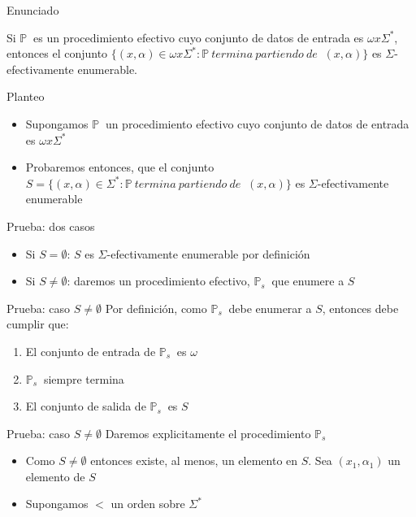 \documentclass[10pt]{beamer}
\newcommand{\p}{\mathbb{P}}
\begin{document}
\begin{frame}{Enunciado}

    Si $\p\ $ es un procedimiento efectivo cuyo conjunto de datos de entrada es
    $\omega x \Sigma^{*}$, entonces el conjunto $\{(x, \alpha) \in \omega x \Sigma^{*}: \p\ termina\ partiendo\ de\ $
    $ (x, \alpha)\}$ es $\Sigma$-efectivamente enumerable.


\end{frame}

\begin{frame}{Planteo}
  \begin{itemize}[<+->]
    \item Supongamos $\p\ $ un procedimiento efectivo cuyo conjunto de datos de
    entrada es $\omega x \Sigma^{*}$
    \item Probaremos entonces, que el conjunto $S = \{(x, \alpha) \in \Sigma^{*}: \p\ termina\ partiendo\ de\ $
    $ (x, \alpha)\}$ es $\Sigma$-efectivamente enumerable
  \end{itemize}

\end{frame}



\begin{frame}{Prueba: dos casos}
  \begin{itemize}[<+->]
    \item Si $S = \emptyset$: $S$ es $\Sigma$-efectivamente enumerable por definición
    \item Si $S \neq \emptyset$: daremos un procedimiento efectivo, $\p_{s}\ $
    que enumere a $S$
  \end{itemize}

\end{frame}


\begin{frame}{Prueba: caso $S \neq \emptyset$}
  Por definición, como $\p_{s}\ $ debe enumerar a $S$, entonces debe cumplir que:

  \begin{enumerate}[<+->]
    \item El conjunto de entrada de $\p_{s}\ $ es $\omega$
    \item $\p_{s}\ $ siempre termina
    \item El conjunto de salida de $\p_{s}\ $ es $S$
  \end{enumerate}

\end{frame}



\begin{frame}{Prueba: caso $S \neq \emptyset$}
  Daremos explicitamente el procedimiento $\p_{s}\ $
  \begin{itemize}[<+->]
    \item Como $S \neq \emptyset$ entonces existe, al menos, un elemento en $S$.
    Sea $(x_{1}, \alpha_{1})$ un elemento de $S$
    \item Supongamos $<$ un orden sobre $\Sigma^{*}$
  \end{itemize}

\end{frame}
\end{document}
